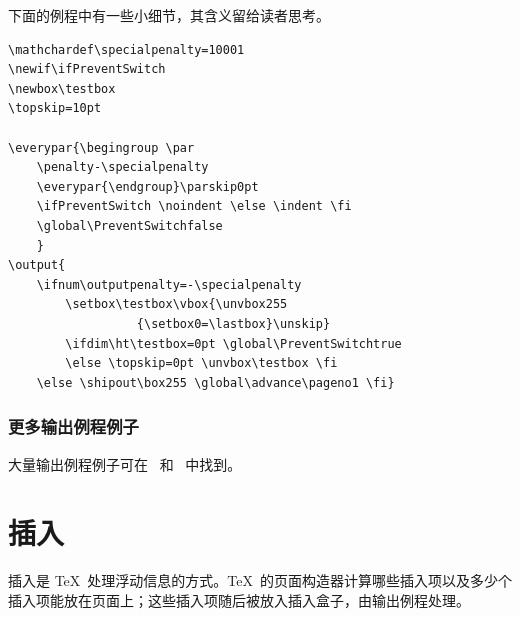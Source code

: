 \documentclass[a4paper]{rapport3}
\begin{document}
下面的例程中有一些小细节，其含义留给读者思考。
\begin{verbatim}
\mathchardef\specialpenalty=10001
\newif\ifPreventSwitch 
\newbox\testbox 
\topskip=10pt

\everypar{\begingroup \par
    \penalty-\specialpenalty
    \everypar{\endgroup}\parskip0pt 
    \ifPreventSwitch \noindent \else \indent \fi
    \global\PreventSwitchfalse
    }
\output{
    \ifnum\outputpenalty=-\specialpenalty 
        \setbox\testbox\vbox{\unvbox255 
                  {\setbox0=\lastbox}\unskip}
        \ifdim\ht\testbox=0pt \global\PreventSwitchtrue
        \else \topskip=0pt \unvbox\testbox \fi
    \else \shipout\box255 \global\advance\pageno1 \fi}
\end{verbatim}


\subsection{更多输出例程例子}

大量输出例程例子可在~\cite{Sal1} 和~\cite{Sal2} 中找到。

\endofchapter
\chapter{插入}\label{insert}

插入是 \TeX\ 处理浮动信息的方式。\TeX\ 的页面构造器计算哪些插入项以及多少个
插入项能放在页面上；这些插入项随后被放入插入盒子，由输出例程处理。
\end{document}
